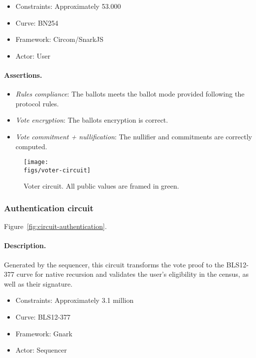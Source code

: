 \begin{itemize}
	\item Constraints: Approximately 53.000
	\item Curve: BN254
	\item Framework: Circom/SnarkJS
	\item Actor: User
\end{itemize}

\paragraph{Assertions.}

\begin{itemize}
	\item \emph{Rules compliance}: The ballots meets the ballot mode provided following the protocol rules.
	\item \emph{Vote encryption}: The ballots encryption is correct.
	\item \emph{Vote commitment + nullification}: The nullifier and commitments are correctly computed.
\end{itemize}

\begin{figure}[h]
	\centerline{\texttt{[image: \\figs/voter-circuit]}}
	\caption{Voter circuit. All public values are framed in green.}
	\label{fig:circuit-voter}
\end{figure}

\subsubsection{Authentication circuit}

Figure~\ref{fig:circuit-authentication}.

\paragraph{Description.} Generated by the sequencer, this circuit transforms the vote proof to the BLS12-377 curve for native recursion and validates the user's eligibility in the census, as well as their signature.

\begin{itemize}
	\item Constraints: Approximately 3.1 million
	\item Curve: BLS12-377
	\item Framework: Gnark
	\item Actor: Sequencer
\end{itemize}

